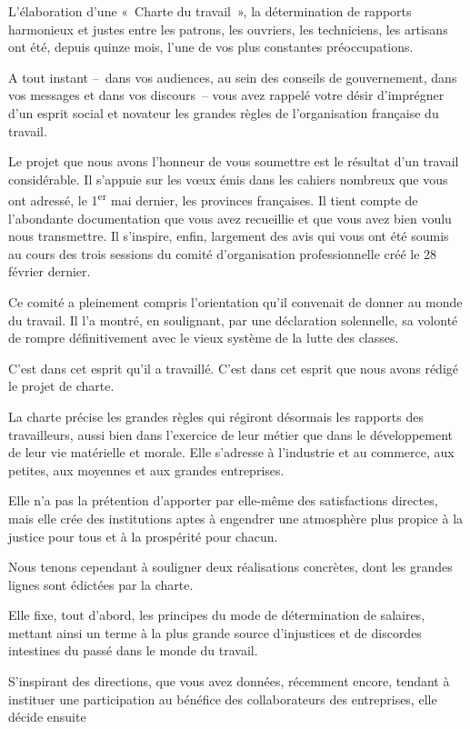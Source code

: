 \documentclass[french,twoside]{book} %
\begin{document}
\noindent L’élaboration d’une « Charte du travail », la détermination de rapports harmonieux et justes entre les patrons, les ouvriers, les techniciens, les artisans ont été, depuis quinze mois, l’une de vos plus constantes préoccupations.\par
A tout instant – dans vos audiences, au sein des conseils de gouvernement, dans vos messages et dans vos discours – vous avez rappelé votre désir d’imprégner d’un esprit social et novateur les grandes règles de l’organisation française du travail.\par
Le projet que nous avons l’honneur de vous soumettre est le résultat d’un travail considérable. Il s’appuie sur les vœux émis dans les cahiers nombreux que vous ont adressé, le 1\textsuperscript{er} mai dernier, les provinces françaises. Il tient compte de l’abondante documentation que vous avez recueillie et que vous avez bien voulu nous transmettre. Il s’inspire, enfin, largement des avis qui vous ont été soumis au cours des trois sessions du comité d’organisation professionnelle créé le 28 février dernier.\par
Ce comité a pleinement compris l’orientation qu’il convenait de donner au monde du travail. Il l’a montré, en soulignant, par une déclaration solennelle, sa volonté de rompre définitivement avec le vieux système de la lutte des classes.\par
C’est dans cet esprit qu’il a travaillé. C’est dans cet esprit que nous avons rédigé le projet de charte.\par
La charte précise les grandes règles qui régiront désormais les rapports des travailleurs, aussi bien dans l’exercice de leur métier que dans le développement de leur vie matérielle et morale. Elle s’adresse à l’industrie et au commerce, aux petites, aux moyennes et aux grandes entreprises.\par
Elle n’a pas la prétention d’apporter par elle-même des satisfactions directes, mais elle crée des institutions aptes à engendrer une atmosphère plus propice à la justice pour tous et à la prospérité pour chacun.\par
Nous tenons cependant à souligner deux réalisations concrètes, dont les grandes lignes sont édictées par la charte.\par
Elle fixe, tout d’abord, les principes du mode de détermination de salaires, mettant ainsi un terme à la plus grande source d’injustices et de discordes intestines du passé dans le monde du travail.\par
S’inspirant des directions, que vous avez données, récemment encore, tendant à instituer une participation au bénéfice des collaborateurs des entreprises, elle décide ensuite\par
\end{document}
